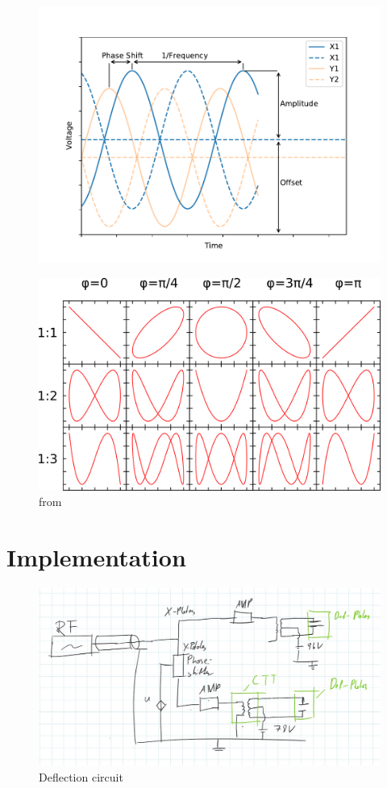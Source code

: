 \begin{figure}
	\centering
	\includegraphics[width=0.7\linewidth]{Chapters/Deflection/VoltageAspects}
	\caption{}
	\label{fig:VoltageAspects}
\end{figure}

\begin{figure}
	\centering
	\includegraphics[width=0.7\linewidth]{Chapters/Deflection/Lissajous}
	\caption{ from \cite{WikipediaLissajous}}
	\label{fig:Lissajous}
\end{figure}

\section{Implementation}

\begin{figure}
	\centering
	\includegraphics[width=0.7\linewidth]{Chapters/Deflection/deflec_circuit}
	\caption{Deflection circuit}
	\label{fig:deflec_circuit}
\end{figure}

